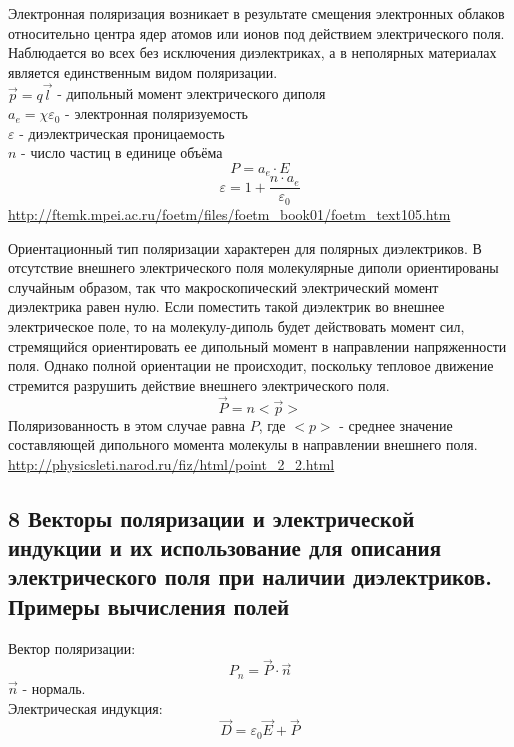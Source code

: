 \documentclass[a4paper,12pt]{article}
\begin{document}
Электронная поляризация возникает в результате смещения электронных облаков относительно центра ядер атомов или ионов под действием электрического поля. Наблюдается во всех без исключения диэлектриках, а в неполярных материалах является единственным видом поляризации.\\
$\vec{p} = q\vec{l}$ - дипольный момент электрического диполя\\
$a_e = \chi \varepsilon_0$ - электронная поляризуемость\\
$\varepsilon$ - диэлектрическая проницаемость\\
$n$ - число частиц в единице объёма\\
\begin{equation}
	P = a_e \cdot E
\end{equation}
\begin{equation}
	\varepsilon = 1 + \frac{n \cdot a_e}{\varepsilon _0}
\end{equation}
\url{http://ftemk.mpei.ac.ru/foetm/files/foetm_book01/foetm_text105.htm}

Ориентационный тип поляризации характерен для полярных диэлектриков. В отсутствие внешнего электрического поля молекулярные диполи ориентированы случайным образом, так что макроскопический электрический момент диэлектрика равен нулю. Если поместить такой диэлектрик во внешнее электрическое поле, то на молекулу-диполь будет действовать момент сил, стремящийся ориентировать ее дипольный момент в направлении напряженности поля. Однако полной ориентации не происходит, поскольку тепловое движение стремится разрушить действие внешнего электрического поля.\\
\begin{equation}
	\vec{P} = n <\vec{p}>
\end{equation}
Поляризованность в этом случае равна $P$, где $<p>$ - среднее значение составляющей дипольного момента молекулы в направлении внешнего поля.\\
\url{http://physicsleti.narod.ru/fiz/html/point_2_2.html}

\subsection{8   Векторы поляризации и электрической индукции и их использование для описания электрического поля при наличии диэлектриков. Примеры вычисления полей}
Вектор поляризации:\\
\begin{equation}
	P_n = \vec{P} \cdot \vec{n}
\end{equation}
$\vec{n}$ - нормаль.\\
Электрическая индукция:\\
\begin{equation}
	\vec{D} = \varepsilon _0 \vec{E} + \vec{P}
\end{equation}
\end{document}
